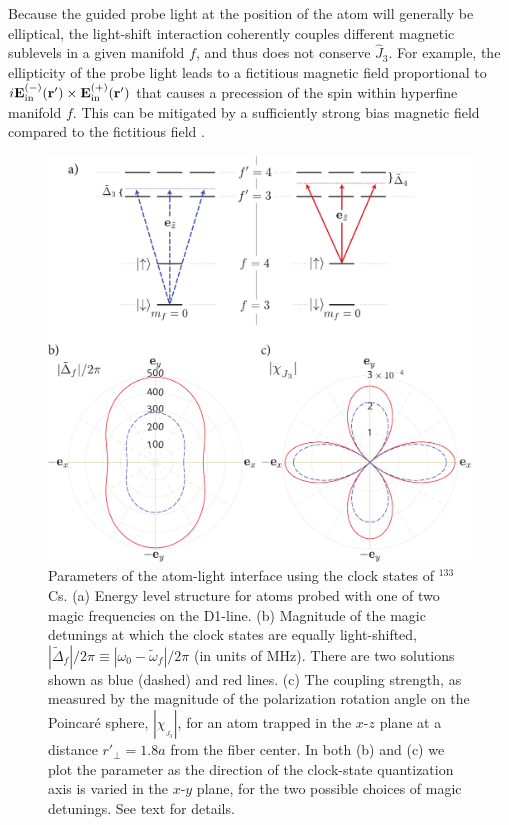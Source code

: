 \documentclass[preprint, aps,pra,onecolumn]{revtex4-1} %
\def\br{\mathbf{r}}
\newcommand{\inp}{{\rm in}}
\newcommand{\magic}[1]{\tilde{\omega}_{#1}}
\begin{document}
Because the guided probe light at the position of the atom will generally be elliptical, the light-shift interaction coherently couples different magnetic sublevels in a given manifold $f$, and thus does not conserve $\hat{J}_3$.  For example, the ellipticity of the probe light leads to a fictitious magnetic field proportional to $i \mathbf{E}^{(-)}_{\inp}(\br') \times \mathbf{E}^{(+)}_{\inp}(\br')$ that causes a precession of the spin within hyperfine manifold $f$.  This can be mitigated by a sufficiently strong bias magnetic field compared to the fictitious field \cite{smith_continuous_2004}. 


\begin{figure}
\includegraphics[scale=0.44]{./Fig3}
\caption{Parameters of the atom-light interface using the clock states of $^{133}$Cs.  
(a) Energy level structure for atoms probed with one of two magic frequencies on the D1-line. 
(b) Magnitude of the magic detunings at which the clock states are equally light-shifted, $| \tilde{\Delta}_{f}|/2\pi \equiv | \omega_0 - \magic{f} |/2\pi$ (in units of MHz). There are two solutions shown as blue (dashed) and red lines. (c) The coupling strength, as measured by the magnitude of the polarization rotation angle on the Poincar\'{e} sphere, $|\chi_{_{ J_3}}|$, for an atom trapped in the $x$-$z$ plane at a distance $ r'\!_\perp=1.8a $ from the fiber center.  In both (b) and (c) we plot the parameter as the direction of the clock-state quantization axis is varied in the $x$-$y$ plane, for the two possible choices of magic detunings.
See text for details.}\label{Fig::CouplingStrength}
\end{figure}
\end{document}
